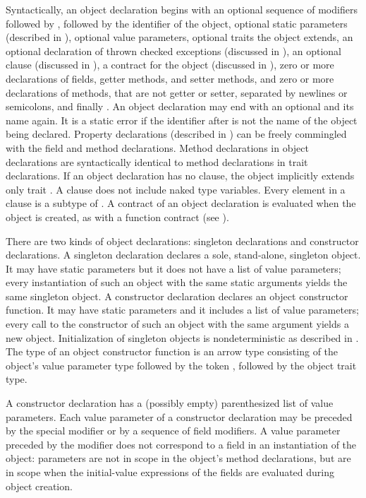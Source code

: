 Syntactically, an object declaration begins with
an optional sequence of modifiers followed by
, followed by
the identifier of the object, optional static parameters
(described in ), optional
value parameters, optional traits the object extends,
an optional declaration of thrown checked exceptions
(discussed in ),
an optional  clause
(discussed in ),
a contract for the object
(discussed in ),
zero or more declarations of fields,
getter methods, and setter methods,
and zero or more declarations of methods, that are not getter or setter,
separated by newlines or semicolons,
and finally .
An object declaration may end with an optional  and its name again.
It is a static error
if the identifier after  is not the name of the object being declared.
Property declarations (described in ) can be freely
commingled with the field and method declarations.
Method declarations in object declarations are syntactically identical to
method declarations in trait declarations.
If an object declaration has no  clause,
the object implicitly extends only trait .
A  clause does not include naked type variables.
Every element in a  clause is a subtype of
.
A contract of an object declaration is evaluated
when the object is created, as with a function contract (see ).

There are two kinds of object declarations:
singleton declarations and constructor declarations.
A singleton declaration declares a sole, stand-alone, singleton object.
It may have static parameters but it does not have a list of value parameters;
every instantiation of such an object with the same static
arguments yields the same singleton object.
A constructor declaration declares an object constructor function.
It may have static parameters and it includes a list of value parameters;
every call to the constructor of such an object with the same argument
yields a new object.
Initialization of singleton objects is nondeterministic
as described in .
The type of an object constructor function is an arrow type
consisting of the object's value parameter type followed by
the token \EXP{\rightarrow}, followed by the object trait type.

A constructor declaration has a (possibly empty) parenthesized list of
value parameters.  Each value parameter of a constructor declaration
may be preceded by the special modifier  or by a
sequence of field modifiers.  A value parameter preceded by the
modifier  does not correspond to a field in an
instantiation of the object:  parameters are not in
scope in the object's method declarations, but are in scope when
the initial-value expressions of the fields
are evaluated during object creation.

